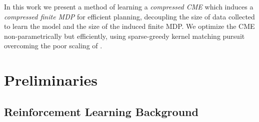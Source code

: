 \documentclass[letterpaper]{article}
\newcommand{\GrunewalderEmbeddingsRL}{GrunewalderEmbeddingsMDP}
\begin{document}

In this work we present a method of learning a \emph{compressed CME} which induces a \emph{compressed finite MDP} for efficient planning, decoupling the size of data collected to learn the model and the size of the induced finite MDP. We optimize the CME non-parametrically but efficiently, using sparse-greedy kernel matching pursuit overcoming the poor scaling of \citet{\GrunewalderEmbeddingsRL}.

\section{Preliminaries}

\subsection{Reinforcement Learning Background} \label{RLbackground}
\end{document}
